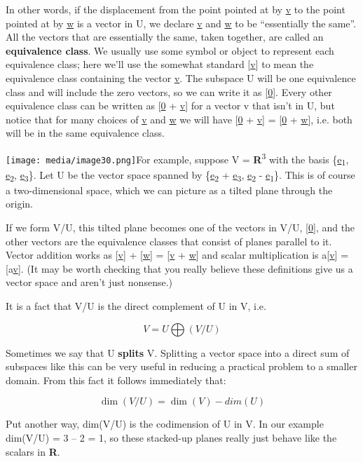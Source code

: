 \documentclass[oneside,english]{amsbook}
\numberwithin{section}{chapter}
\theoremstyle{plain}
\theoremstyle{definition}
\begin{document}
In other words, if the displacement from the point pointed at by \ul{v}
to the point pointed at by \ul{w} is a vector in U, we declare \ul{v}
and \ul{w} to be ``essentially the same''. All the vectors that are
essentially the same, taken together, are called an \textbf{equivalence
	class}. We usually use some symbol or object to represent each
equivalence class; here we'll use the somewhat standard {[}\ul{v}{]} to
mean the equivalence class containing the vector \ul{v}. The subspace U
will be one equivalence class and will include the zero vectors, so we
can write it as {[}\ul{0}{]}. Every other equivalence class can be
written as {[}\ul{0} + \ul{v}{]} for a vector v that isn't in U, but
notice that for many choices of \ul{v} and \ul{w} we will have {[}\ul{0}
+ \ul{v}{]} = {[}\ul{0} + \ul{w}{]}, i.e. both will be in the same
equivalence class.

\texttt{[image: media/image30.png]}For
example, suppose V = \textbf{R}\textsuperscript{3} with the basis
\{\ul{e}\textsubscript{1}, \ul{e}\textsubscript{2},
\ul{e}\textsubscript{3}\}. Let U be the vector space spanned by
\{\ul{e}\textsubscript{2} + \ul{e}\textsubscript{3},
\ul{e}\textsubscript{2} - \ul{e}\textsubscript{1}\}. This is of course a
two-dimensional space, which we can picture as a tilted plane through
the origin.

If we form V/U, this tilted plane becomes one of the vectors in V/U,
{[}\ul{0}{]}, and the other vectors are the equivalence classes that
consist of planes parallel to it. Vector addition works as {[}\ul{v}{]}
+ {[}\ul{w}{]} = {[}\ul{v} + \ul{w}{]} and scalar multiplication is
a{[}\ul{v}{]} = {[}a\ul{v}{]}. (It may be worth checking that you really
believe these definitions give us a vector space and aren't just
nonsense.)

It is a fact that V/U is the direct complement of U in V, i.e.

\[V = U\bigoplus(V/U)\]

Sometimes we say that U \textbf{splits} V. Splitting a vector space into
a direct sum of subspaces like this can be very useful in reducing a
practical problem to a smaller domain. From this fact it follows
immediately that:

\[\dim(V/U) = \dim(V) - dim(U)\]

Put another way, dim(V/U) is the codimension of U in V. In our example
dim(V/U) = 3 -- 2 = 1, so these stacked-up planes really just behave
like the scalars in \textbf{R}.
\end{document}
